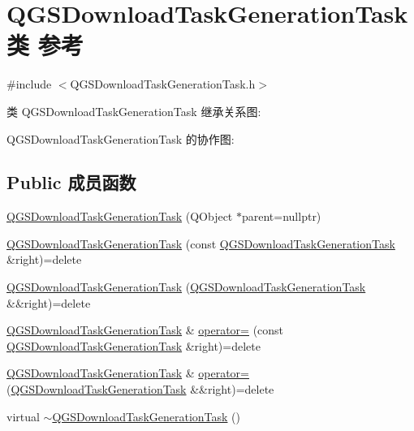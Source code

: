 \hypertarget{class_q_g_s_download_task_generation_task}{}\section{Q\+G\+S\+Download\+Task\+Generation\+Task类 参考}
\label{class_q_g_s_download_task_generation_task}


{\ttfamily \#include $<$Q\+G\+S\+Download\+Task\+Generation\+Task.\+h$>$}



类 Q\+G\+S\+Download\+Task\+Generation\+Task 继承关系图\+:


Q\+G\+S\+Download\+Task\+Generation\+Task 的协作图\+:
\subsection*{Public 成员函数}
\begin{DoxyCompactItemize}
\item 
\mbox{\hyperlink{class_q_g_s_download_task_generation_task_a99498a68f743d3da3c9c56d6f0714442}{Q\+G\+S\+Download\+Task\+Generation\+Task}} (Q\+Object $\ast$parent=nullptr)
\item 
\mbox{\hyperlink{class_q_g_s_download_task_generation_task_a770cf3fe4cffe97dd96b4e2924ac3687}{Q\+G\+S\+Download\+Task\+Generation\+Task}} (const \mbox{\hyperlink{class_q_g_s_download_task_generation_task}{Q\+G\+S\+Download\+Task\+Generation\+Task}} \&right)=delete
\item 
\mbox{\hyperlink{class_q_g_s_download_task_generation_task_a52cc4799aefaa9ee274199f8cd6b763c}{Q\+G\+S\+Download\+Task\+Generation\+Task}} (\mbox{\hyperlink{class_q_g_s_download_task_generation_task}{Q\+G\+S\+Download\+Task\+Generation\+Task}} \&\&right)=delete
\item 
\mbox{\hyperlink{class_q_g_s_download_task_generation_task}{Q\+G\+S\+Download\+Task\+Generation\+Task}} \& \mbox{\hyperlink{class_q_g_s_download_task_generation_task_aecc0ef98c127f38d319c635914487a33}{operator=}} (const \mbox{\hyperlink{class_q_g_s_download_task_generation_task}{Q\+G\+S\+Download\+Task\+Generation\+Task}} \&right)=delete
\item 
\mbox{\hyperlink{class_q_g_s_download_task_generation_task}{Q\+G\+S\+Download\+Task\+Generation\+Task}} \& \mbox{\hyperlink{class_q_g_s_download_task_generation_task_adc94c4759cb957d3bbaafc66ffd6f7a2}{operator=}} (\mbox{\hyperlink{class_q_g_s_download_task_generation_task}{Q\+G\+S\+Download\+Task\+Generation\+Task}} \&\&right)=delete
\item 
virtual \mbox{\hyperlink{class_q_g_s_download_task_generation_task_a58476b575beb321f7ad1f6ad800b97f9}{$\sim$\+Q\+G\+S\+Download\+Task\+Generation\+Task}} ()
\end{DoxyCompactItemize}
